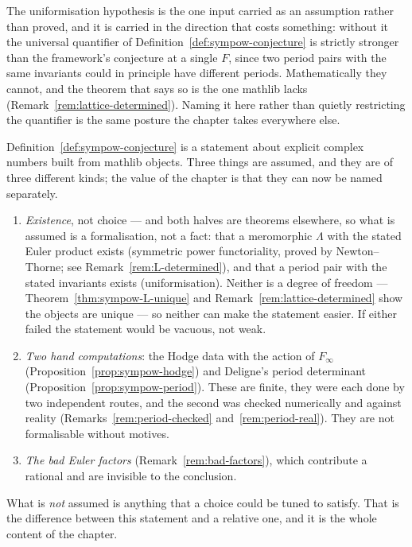 The uniformisation hypothesis is the one input carried as an assumption rather than proved, and
it is carried in the direction that costs something: without it the universal quantifier of
Definition~\ref{def:sympow-conjecture} is strictly stronger than the framework's conjecture at a
single $F$, since two period pairs with the same invariants could in principle have different
periods. Mathematically they cannot, and the theorem that says so is the one mathlib lacks
(Remark~\ref{rem:lattice-determined}). Naming it here rather than quietly restricting the
quantifier is the same posture the chapter takes everywhere else.

\begin{remark}
  \label{rem:sympow-residue}
  Definition~\ref{def:sympow-conjecture} is a statement about explicit complex numbers built
  from mathlib objects. Three things are assumed, and they are of three different kinds; the
  value of the chapter is that they can now be named separately.
  \begin{enumerate}
    \item \emph{Existence}, not choice --- and both halves are theorems elsewhere, so what is
      assumed is a formalisation, not a fact: that a meromorphic $\Lambda$ with the stated
      Euler product exists (symmetric power functoriality, proved by Newton--Thorne; see
      Remark~\ref{rem:L-determined}), and that a period pair with the stated
      invariants exists (uniformisation). Neither is a degree of freedom ---
      Theorem~\ref{thm:sympow-L-unique} and Remark~\ref{rem:lattice-determined} show the
      objects are unique --- so neither can make the statement easier. If either failed the
      statement would be vacuous, not weak.
    \item \emph{Two hand computations}: the Hodge data with the action of $F_{\infty}$
      (Proposition~\ref{prop:sympow-hodge}) and Deligne's period determinant
      (Proposition~\ref{prop:sympow-period}). These are finite, they were each done by two
      independent routes, and the second was checked numerically and against reality
      (Remarks~\ref{rem:period-checked} and~\ref{rem:period-real}). They are not formalisable
      without motives.
    \item \emph{The bad Euler factors} (Remark~\ref{rem:bad-factors}), which contribute a
      rational and are invisible to the conclusion.
  \end{enumerate}
  What is \emph{not} assumed is anything that a choice could be tuned to satisfy. That is the
  difference between this statement and a relative one, and it is the whole content of the
  chapter.
\end{remark}

